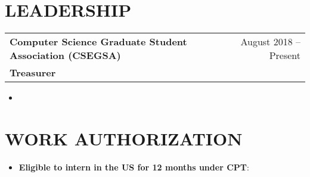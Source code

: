 \documentclass[11pt]{article}
\makeatletter
\newcommand{\resumeItemSmall}[2]{
  \item\small{
    \textbf{#1}{: #2 \vspace{-2pt}}
  }
}
\newcommand{\resumeExpHeading}[5]{
    \vspace{-1pt}
    \begin{tabular*}{\textwidth}{l@{\extracolsep{\fill}}r}
      \textbf{\large#1}{#2} & #5 \\
      \textbf{#3}\text{#4} &  \\
    \end{tabular*}
}
\newcommand{\resumeSubItemSmall}[2]{\resumeItemSmall{#1}{#2}\vspace{-4pt}}
\newcommand{\resumeSubHeadingListStart}{\begin{itemize}[leftmargin=*]}
\newcommand{\resumeSubHeadingListEnd}{\end{itemize}}
\newcommand{\normalListItem}[1]{\item{#1}\vspace{-6pt}}
\makeatother
\begin{document}
%
\section{LEADERSHIP}

    \resumeExpHeading
      {Computer Science Graduate Student Association (CSEGSA)}{}
      {Treasurer}{}{August 2018 -- Present}
      \resumeSubHeadingListStart
        \normalListItem
          \small{Responsible for overseeing and presenting budgets, accounts and financial statements of the association}
        \resumeSubHeadingListEnd

\section{WORK AUTHORIZATION}
  \resumeSubHeadingListStart
    \resumeSubItemSmall{Eligible to intern in the US for 12 months under CPT}{}
  \resumeSubHeadingListEnd
\end{document}
